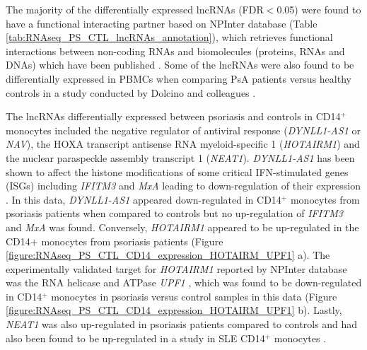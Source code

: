 The majority of the differentially expressed lncRNAs (FDR$<$0.05) were found to have a functional interacting partner based on NPInter database (Table \ref{tab:RNAseq_PS_CTL_lncRNAs_annotation}), which retrieves functional interactions between non-coding RNAs and biomolecules (proteins, RNAs and DNAs) which have been published \parencite{Hao2016}. Some of the lncRNAs were also found to be differentially expressed in PBMCs when comparing PsA patients versus healthy controls in a study conducted by Dolcino and colleagues \parencite{Dolcino2018}.



The lncRNAs differentially expressed between psoriasis and controls in CD14$^+$ monocytes included the negative regulator of antiviral response (\textit{DYNLL1-AS1} or \textit{NAV}), the HOXA transcript antisense RNA myeloid-specific 1 (\textit{HOTAIRM1}) and the nuclear paraspeckle assembly transcript 1 (\textit{NEAT1}). \textit{DYNLL1-AS1} has been shown to affect the histone modifications of some critical IFN-stimulated genes (ISGs) including \textit{IFITM3} and \textit{MxA} leading to down-regulation of their expression \parencite{Ouyang2014}. In this data, \textit{DYNLL1-AS1} appeared down-regulated in CD14$^+$ monocytes from psoriasis patients when compared to controls but no up-regulation of \textit{IFITM3} and \textit{MxA} was found. Conversely, \textit{HOTAIRM1} appeared to be up-regulated in the CD14$+$ monocytes from psoriasis patients (Figure \ref{figure:RNAseq_PS_CTL_CD14_expression_HOTAIRM_UPF1} a). The experimentally validated target for \textit{HOTAIRM1} reported by NPInter database was the RNA helicase and ATPase \textit{UPF1} \parencite{Hao2016}, which was found to be down-regulated in CD14$^+$ monocytes in psoriasis versus control samples in this data (Figure \ref{figure:RNAseq_PS_CTL_CD14_expression_HOTAIRM_UPF1} b). Lastly, \textit{NEAT1} was also up-regulated in psoriasis patients compared to controls and had also been found to be up-regulated in a study in SLE CD14$^+$ monocytes \parencite{Zhang2016}.

